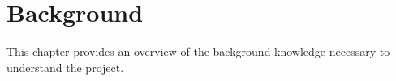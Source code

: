\chapter{Background}\label{background}
This chapter provides an overview of the background knowledge necessary to understand the project.





